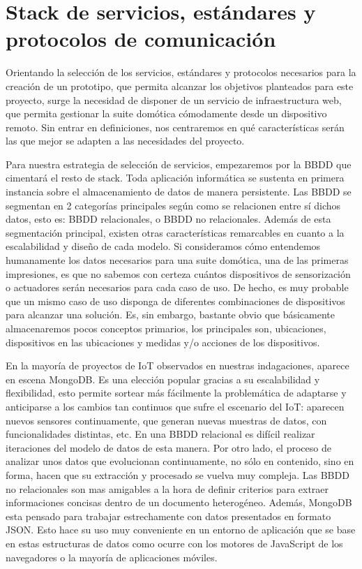 \section{Stack de servicios, estándares y protocolos de comunicación}
\label{ch:Capitulo2.3}



Orientando la selección de los servicios, estándares y protocolos necesarios para la creación de un prototipo, que permita alcanzar los objetivos planteados para este proyecto, surge la necesidad de disponer de un servicio de infraestructura web, que permita gestionar la suite domótica cómodamente desde un dispositivo remoto. Sin entrar en definiciones, nos centraremos en qué características serán las que mejor se adapten a las necesidades del proyecto.

\vspace{1cm}

Para nuestra estrategia de selección de servicios, empezaremos por la BBDD que cimentará el resto de stack. Toda aplicación informática se sustenta en primera instancia sobre el almacenamiento de datos de manera persistente. Las BBDD se segmentan en 2 categorías principales según como se relacionen entre sí dichos datos, esto es: BBDD relacionales, o BBDD no relacionales. Además de esta segmentación principal, existen otras características remarcables en cuanto a la escalabilidad y diseño de cada modelo. Si consideramos cómo entendemos humanamente los datos necesarios para una suite domótica, una de las primeras impresiones, es que no sabemos con certeza cuántos dispositivos de sensorización o actuadores serán necesarios para cada caso de uso. De hecho, es muy probable que un mismo caso de uso disponga de diferentes combinaciones de dispositivos para alcanzar una solución. Es, sin embargo, bastante obvio que básicamente almacenaremos pocos conceptos primarios, los principales son, ubicaciones, dispositivos en las ubicaciones y medidas y/o acciones de los dispositivos.

\vspace{1cm}

En la mayoría de proyectos de IoT observados en nuestras indagaciones, aparece en escena MongoDB. Es una elección popular gracias a su escalabilidad y flexibilidad, esto permite sortear más fácilmente la problemática de adaptarse y anticiparse a los cambios tan continuos que sufre el escenario del IoT: aparecen nuevos sensores continuamente, que generan nuevas muestras de datos, con funcionalidades distintas, etc. En una BBDD relacional es difícil realizar iteraciones del modelo de datos de esta manera. Por otro lado, el proceso de analizar unos datos que evolucionan continuamente, no sólo en contenido, sino en forma, hacen que su extracción y procesado se vuelva muy compleja. Las BBDD no relacionales son mas amigables a la hora de definir criterios para extraer informaciones concisas dentro de un documento heterogéneo. Además, MongoDB esta pensado para trabajar estrechamente con datos presentados en formato JSON. Esto hace su uso muy conveniente en un entorno de aplicación que se base en estas estructuras de datos como ocurre con los motores de JavaScript de los navegadores o la mayoría de aplicaciones móviles.

